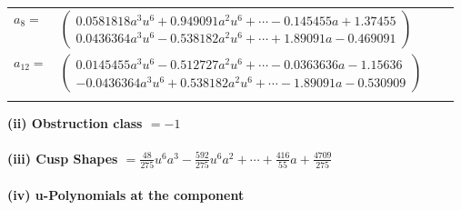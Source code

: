 \documentclass[1p]{elsarticle_modified}
\theoremstyle{definition}
\begin{document}
\begin{tabular}{m{7pt} m{180pt} m{7pt} m{180pt} }
\flushright $a_{8}=$&$\begin{pmatrix}0.0581818 a^{3} u^{6}+0.949091 a^{2} u^{6}+\cdots-0.145455 a+1.37455\\0.0436364 a^{3} u^{6}-0.538182 a^{2} u^{6}+\cdots+1.89091 a-0.469091\end{pmatrix}$ \\
\flushright $a_{12}=$&$\begin{pmatrix}0.0145455 a^{3} u^{6}-0.512727 a^{2} u^{6}+\cdots-0.0363636 a-1.15636\\-0.0436364 a^{3} u^{6}+0.538182 a^{2} u^{6}+\cdots-1.89091 a-0.530909\end{pmatrix}$\\&\end{tabular}
\flushleft \textbf{(ii) Obstruction class $= -1$}\\~\\
\flushleft \textbf{(iii) Cusp Shapes $= \frac{48}{275} u^6 a^3-\frac{592}{275} u^6 a^2+\cdots+\frac{416}{55} a+\frac{4709}{275}$}\\~\\
\newpage\renewcommand{\arraystretch}{1}
\flushleft \textbf{(iv) u-Polynomials at the component}\newline \\
\end{document}
